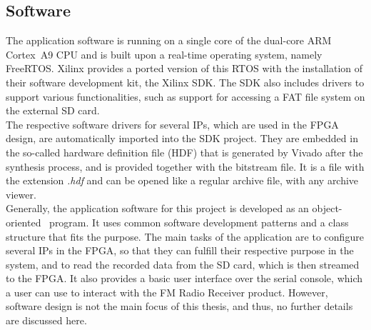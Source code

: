 \subsection{Software}

The application software is running on a single core of the dual-core ARM Cortex~A9 CPU and is built upon a real-time operating system, namely FreeRTOS.
Xilinx provides a ported version of this RTOS with the installation of their software development kit, the Xilinx SDK.
The SDK also includes drivers to support various functionalities, such as support for accessing a FAT file system on the external SD card.\\

The respective software drivers for several IPs, which are used in the FPGA design, are automatically imported into the SDK project.
They are embedded in the so-called hardware definition file (HDF) that is generated by Vivado after the synthesis process, and is provided together with the bitstream file.
It is a file with the extension \textit{.hdf} and can be opened like a regular archive file, with any archive viewer.\\

Generally, the application software for this project is developed as an object-oriented \cplusplus\ program.
It uses common software development patterns and a class structure that fits the purpose.
The main tasks of the application are to configure several IPs in the FPGA, so that they can fulfill their respective purpose in the system, and to read the recorded data from the SD card, which is then streamed to the FPGA.
It also provides a basic user interface over the serial console, which a user can use to interact with the FM Radio Receiver product.
However, software design is not the main focus of this thesis, and thus, no further details are discussed here.
